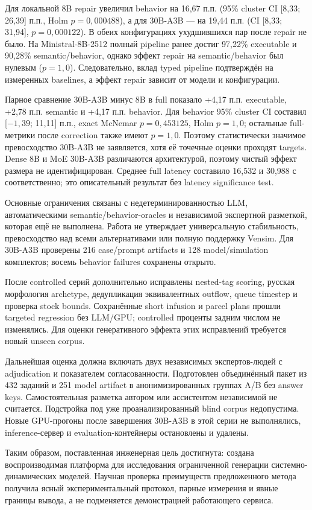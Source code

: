 Для локальной 8B repair увеличил behavior на 16,67 п.п. (95\% cluster CI [8,33; 26,39] п.п., Holm $p=0{,}000488$), а для 30B-A3B --- на 19,44 п.п. (CI [8,33; 31,94], $p=0{,}000122$). В обеих конфигурациях ухудшившихся пар после repair не было. На Ministral-8B-2512 полный pipeline ранее достиг 97,22\% executable и 90,28\% semantic/behavior, однако эффект repair на semantic/behavior был нулевым ($p=1,0$). Следовательно, вклад typed pipeline подтверждён на измеренных baselines, а эффект repair зависит от модели и конфигурации.

Парное сравнение 30B-A3B минус 8B в full показало +4,17 п.п. executable, +2,78 п.п. semantic и +4,17 п.п. behavior. Для behavior 95\% cluster CI составил [$-1,39$; 11,11] п.п., exact McNemar $p=0{,}453125$, Holm $p=1{,}0$; остальные full-метрики после correction также имеют $p=1{,}0$. Поэтому статистически значимое превосходство 30B-A3B не заявляется, хотя её точечные оценки проходят targets. Dense 8B и MoE 30B-A3B различаются архитектурой, поэтому чистый эффект размера не идентифицирован. Среднее full latency составило 16,532 и 30,988 с соответственно; это описательный результат без latency significance test.

Основные ограничения связаны с недетерминированностью LLM, автоматическими semantic/behavior-oracles и независимой экспертной разметкой, которая ещё не выполнена. Работа не утверждает универсальную стабильность, превосходство над всеми альтернативами или полную поддержку Vensim. Для 30B-A3B проверены 216 case/prompt artifacts и 128 model/simulation комплектов; восемь behavior failures сохранены открыто.

После controlled серий дополнительно исправлены nested-tag scoring, русская морфология archetype, дедупликация эквивалентных outflow, queue timestep и проверка stock bounds. Сохранённые short infusion и parcel plans прошли targeted regression без LLM/GPU; controlled проценты задним числом не изменялись. Для оценки генеративного эффекта этих исправлений требуется новый unseen corpus.

Дальнейшая оценка должна включать двух независимых экспертов-людей с adjudication и показателем согласованности. Подготовлен объединённый пакет из 432 заданий и 251 model artifact в анонимизированных группах A/B без answer keys. Самостоятельная разметка автором или ассистентом независимой не считается. Подстройка под уже проанализированный blind corpus недопустима. Новые GPU-прогоны после завершения 30B-A3B в этой серии не выполнялись, inference-сервер и evaluation-контейнеры остановлены и удалены.

Таким образом, поставленная инженерная цель достигнута: создана воспроизводимая платформа для исследования ограниченной генерации системно-динамических моделей. Научная проверка преимуществ предложенного метода получила ясный экспериментальный протокол, парные измерения и явные границы вывода, а не подменяется демонстрацией работающего сервиса.
